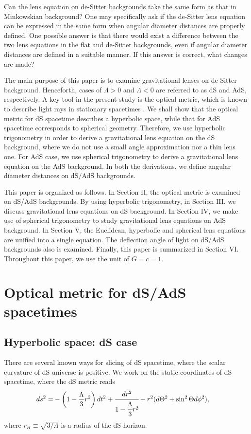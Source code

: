 \documentclass[twocolumn,showpacs,preprintnumbers,amsmath,amssymb]{revtex4-1}
\begin{document}
Can the lens equation on de-Sitter backgrounds 
take the same form 
as that in Minkowskian background? 
One may specifically ask if  
the de-Sitter lens equation can be expressed in the same form 
when angular diameter distances are properly defined. 
One possible answer is that there would exist 
a difference between the two lens equations 
in the flat and de-Sitter backgrounds, 
even if angular diameter distances are defined in a suitable manner. 
If this answer is correct, 
what changes are made? 

The main purpose of this paper is to examine gravitational lenses 
on de-Sitter background. 
Henceforth, cases of $\Lambda > 0$ and $\Lambda < 0$ 
are referred to as dS and AdS, respectively. 
A key tool in the present study is the optical metric, which is known to 
describe light rays in stationary spacetimes 
\cite{AK2000, GW, Ishihara2016,Ono2017}. 
We shall show that the optical metric for dS spacetime describes 
a hyperbolic space, 
while that for AdS spacetime corresponds to 
spherical geometry. 
Therefore, we use hyperbolic trigonometry 
in order to derive a gravitational lens equation on the dS background, 
where we do not use a small angle approximation nor 
a thin lens one. 
For AdS case, 
we use spherical trigonometry to 
derive a gravitational lens equation on the AdS background. 
In both the derivations, 
we define angular diameter distances on dS/AdS backgrounds. 

This paper is organized as follows. 
In Section II, 
the optical metric is examined on dS/AdS backgrounds. 
By using hyperbolic trigonometry, 
in Section III, 
we discuss gravitational lens equations 
on dS background. 
In Section IV, 
we make use of spherical trigonometry 
to study gravitational lens equations 
on AdS background. 
In Section V, 
the Euclidean, hyperbolic and spherical lens equations 
are unified into a single equation. 
The deflection angle of light on dS/AdS backgrounds 
also is examined. 
Finally, this paper is summarized in Section VI. 
Throughout this paper, we use the unit of $G = c = 1$. 




\section{Optical metric for dS/AdS spacetimes}
\subsection{Hyperbolic space:  dS case}
There are several known ways for slicing of dS spacetime, 
where the scalar curvature of dS universe is positive. 
We work on the static coordinates of dS spacetime, 
where the dS metric reads 
\begin{align}
  d s^2 =& -\left(1 - \frac{\Lambda}{3}r^2\right) d t^2 
 + \cfrac{d r^2}{1 - \cfrac{\Lambda}{3}r^2}
+ r^2( d\Theta^2 + \sin^2 \Theta d\phi^2) ,
\label{dS}
\end{align}
where $r_H \equiv \sqrt{3/\Lambda}$ is a radius of the dS horizon.
\end{document}
